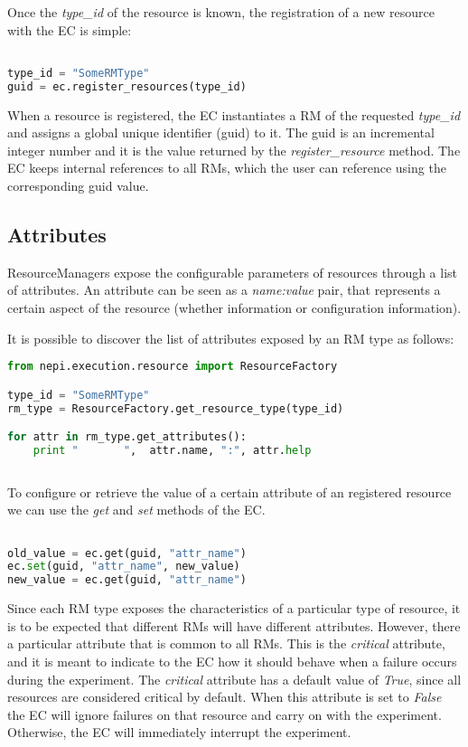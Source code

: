 Once the \emph{type\_id} of the resource is known, the registration of a
new resource with the EC is simple:

\begin{lstlisting}[language=Python]

type_id = "SomeRMType"
guid = ec.register_resources(type_id)

\end{lstlisting}

When a resource is registered, the EC instantiates a RM of the 
requested \emph{type\_id} and assigns a global unique identifier 
(guid) to it. The guid is an incremental integer number and it 
is the value returned by the \emph{register\_resource} method.
The EC keeps internal references to all RMs, which the user can
reference using the corresponding guid value.

\subsection{Attributes}

ResourceManagers expose the configurable parameters of resources
through a list of attributes. An attribute can be seen as a
\emph{{name:value}} pair, that represents a certain aspect of
the resource (whether information or configuration information).

It is possible to discover the list of attributes exposed by an 
RM type as follows:

\begin{lstlisting}[language=Python]
from nepi.execution.resource import ResourceFactory

type_id = "SomeRMType"
rm_type = ResourceFactory.get_resource_type(type_id)

for attr in rm_type.get_attributes():
    print "       ",  attr.name, ":", attr.help
    
\end{lstlisting}

To configure or retrieve the value of a certain attribute of
an registered resource we can use the \emph{get} and \emph{set}
methods of the EC.

\begin{lstlisting}[language=Python]

old_value = ec.get(guid, "attr_name")
ec.set(guid, "attr_name", new_value)
new_value = ec.get(guid, "attr_name")

\end{lstlisting}

Since each RM type exposes the characteristics of a particular type
of resource, it is to be expected that different RMs will have different
attributes. However, there a particular attribute that is common to all RMs.
This is the \emph{critical} attribute, and it is meant to indicate to the EC
how it should behave when a failure occurs during the experiment. 
The \emph{critical} attribute has a default value of \emph{True}, since
all resources are considered critical by default. 
When this attribute is set to \emph{False} the EC will ignore failures on that 
resource and carry on with the experiment. Otherwise, the EC will immediately 
interrupt the experiment.


